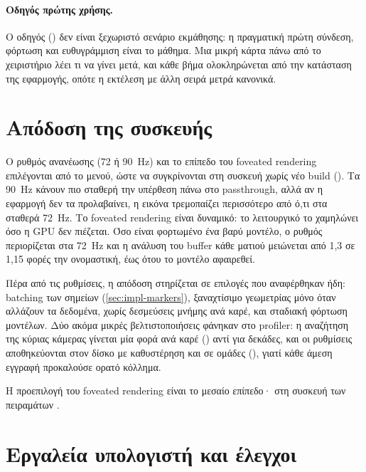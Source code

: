 \paragraph{Οδηγός πρώτης χρήσης.} Ο οδηγός () δεν είναι ξεχωριστό σενάριο εκμάθησης: η πραγματική πρώτη σύνδεση, φόρτωση και ευθυγράμμιση είναι το μάθημα. Μια μικρή κάρτα πάνω από το χειριστήριο λέει τι να γίνει μετά, και κάθε βήμα ολοκληρώνεται από την κατάσταση της εφαρμογής, οπότε η εκτέλεση με άλλη σειρά μετρά κανονικά.


\section{Απόδοση της συσκευής}
\label{sec:impl-performance}

Ο ρυθμός ανανέωσης (72 ή \SI{90}{Hz}) και το επίπεδο του foveated rendering επιλέγονται από το μενού, ώστε να συγκρίνονται στη συσκευή χωρίς νέο build (). Τα \SI{90}{Hz} κάνουν πιο σταθερή την υπέρθεση πάνω στο passthrough, αλλά αν η εφαρμογή δεν τα προλαβαίνει, η εικόνα τρεμοπαίζει περισσότερο από ό,τι στα σταθερά \SI{72}{Hz}. Το foveated rendering είναι δυναμικό: το λειτουργικό το χαμηλώνει όσο η GPU δεν πιέζεται. Όσο είναι φορτωμένο ένα βαρύ μοντέλο, ο ρυθμός περιορίζεται στα \SI{72}{Hz} και η ανάλυση του buffer κάθε ματιού μειώνεται από 1,3 σε 1,15 φορές την ονομαστική, έως ότου το μοντέλο αφαιρεθεί.

Πέρα από τις ρυθμίσεις, η απόδοση στηρίζεται σε επιλογές που αναφέρθηκαν ήδη: batching των σημείων (\cref{sec:impl-markers}), ξαναχτίσιμο γεωμετρίας μόνο όταν αλλάζουν τα δεδομένα, χωρίς δεσμεύσεις μνήμης ανά καρέ, και σταδιακή φόρτωση μοντέλων. Δύο ακόμα μικρές βελτιστοποιήσεις φάνηκαν στο profiler: η αναζήτηση της κύριας κάμερας γίνεται μία φορά ανά καρέ () αντί για δεκάδες, και οι ρυθμίσεις αποθηκεύονται στον δίσκο με καθυστέρηση και σε ομάδες (), γιατί κάθε άμεση εγγραφή προκαλούσε ορατό κόλλημα.

Η προεπιλογή του foveated rendering είναι το μεσαίο επίπεδο· στη συσκευή των πειραμάτων .

\section{Εργαλεία υπολογιστή και έλεγχοι}
\label{sec:impl-tools}

